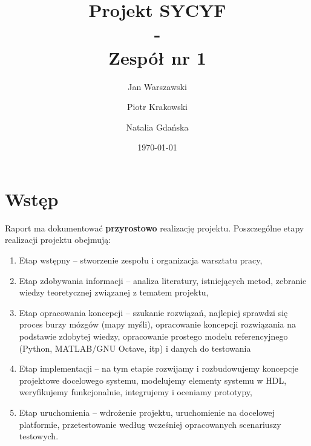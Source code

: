 \documentclass[a4paper,titleauthor]{mwart}
\title{{\Huge  Projekt SYCYF}\\ - \\{\Large Zespół nr 1}\\ }
\author{Jan Warszawski \and Piotr Krakowski \and Natalia Gdańska}
\affil{Politechnika Warszawska, Instytut Telekomunikacji}
\date{\today}
\begin{document}
	
\maketitle
\let\thefootnote\relax{}

\begin{versionhistory}
\end{versionhistory}

\tableofcontents

\section{Wstęp}
\label{sec:wstep}%

Raport ma dokumentować \textbf{przyrostowo} realizację projektu. Poszczególne etapy realizacji projektu obejmują: 

\renewcommand{\labelenumi}{\Roman{enumi}}
\begin{enumerate}\setlength{\itemsep}{0.2\baselineskip} 
	\item Etap wstępny – stworzenie zespołu i organizacja warsztatu pracy, 
	\item Etap zdobywania informacji – analiza literatury, istniejących metod, zebranie wiedzy teoretycznej związanej z tematem projektu, 
	\item Etap opracowania koncepcji – szukanie rozwiązań, najlepiej sprawdzi się proces burzy mózgów (mapy myśli), opracowanie koncepcji rozwiązania  na podstawie zdobytej wiedzy, opracowanie prostego modelu referencyjnego (Python, MATLAB/GNU Octave, itp) i danych do testowania  
	\item Etap implementacji – na tym etapie rozwijamy i rozbudowujemy koncepcje projektowe docelowego systemu, modelujemy elementy systemu w HDL, weryfikujemy funkcjonalnie, integrujemy i oceniamy prototypy, 
	\item Etap uruchomienia – wdrożenie projektu, uruchomienie na docelowej platformie, przetestowanie według wcześniej opracowanych scenariuszy testowych. 
\end{enumerate}
\end{document}
